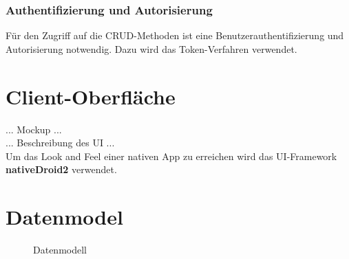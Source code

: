 \subsubsection{Authentifizierung und Autorisierung} 

Für den Zugriff auf die CRUD-Methoden ist eine Benutzerauthentifizierung und Autorisierung notwendig. Dazu wird das Token-Verfahren verwendet.

\newpage
\section{Client-Oberfläche}
\label{sec_konzeption_client-ui}


... Mockup ... \\
... Beschreibung des UI ...\\

Um das \glqq{}Look and Feel\grqq{} einer nativen App zu erreichen wird das UI-Framework \textbf{nativeDroid2} verwendet. \\

\newpage
\section{Datenmodel}
\label{sec_konzeption_datamodel}

\begin{figure}[htp] 
\caption{Datenmodell}
\label{image_konzeption_datenmodell}
\end{figure} 
